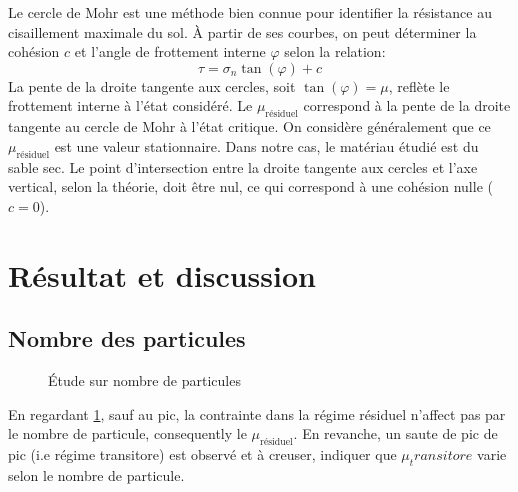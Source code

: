 \documentclass[5p,authoryear,square]{elsarticle}
\begin{document}
Le cercle de Mohr est une méthode bien connue pour identifier la résistance au cisaillement maximale du sol.  
À partir de ses courbes, on peut déterminer la cohésion $c$ et l'angle de frottement interne $\varphi$ selon la relation:
\begin{equation}
    \tau = \sigma_n \tan(\varphi) + c
    \label{eq:tangentMohr}
\end{equation}
La pente de la droite tangente aux cercles, soit $\tan(\varphi) = \mu$, reflète le frottement interne à l'état considéré.  
Le $\mu_{\text{résiduel}}$ correspond à la pente de la droite tangente au cercle de Mohr à l'état critique.  
On considère généralement que ce $\mu_{\text{résiduel}}$ est une valeur stationnaire.  
Dans notre cas, le matériau étudié est du sable sec. Le point d'intersection entre la droite tangente aux cercles et l'axe vertical, selon la théorie, doit être nul, ce qui correspond à une cohésion nulle ($c=0$).

\section{Résultat et discussion}\label{resultat}

\subsection{Nombre des particules}\label{N}

            \begin{figure}
                \centering
                \scalebox{0.5}{}
                \caption{Étude sur nombre de particules}
                \label{comparerNP}
            \end{figure}
            En regardant \cref{comparerNP}, sauf au pic, la contrainte dans la régime résiduel n'affect pas par le nombre de particule, consequently le $\mu_{\text{résiduel}}$.
En revanche, un saute de pic de pic (i.e régime transitore) est observé et à creuser, indiquer que $\mu_transitore$ varie selon le nombre de particule.
\end{document}

